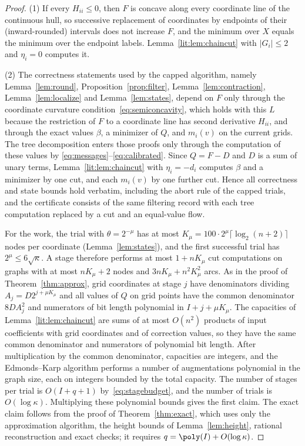 \begin{proof}
(1) If every $H_{ii}\le0$, then $F$ is concave along every coordinate line of the continuous
hull, so successive replacement of coordinates by endpoints of their (inward-rounded) intervals
does not increase $F$, and the minimum over $X$ equals the minimum over the endpoint labels.
Lemma~\ref{lit:lem:chaincut} with $|G_i|\le2$ and $\eta_i=0$ computes it.

(2) The correctness statements used by the capped algorithm, namely Lemma~\ref{lem:round},
Proposition~\ref{prop:filter}, Lemma~\ref{lem:contraction}, Lemma~\ref{lem:localize} and
Lemma~\ref{lem:states}, depend on $F$ only through the coordinate curvature
condition~\eqref{eq:semiconcavity}, which holds with this $L$ because the restriction of $F$ to a
coordinate line has second derivative $H_{ii}$, and through the exact values $\beta$, a
minimizer of $Q$, and $m_i(v)$ on the current grids. The tree decomposition enters those proofs
only through the computation of these values by \eqref{eq:messages}--\eqref{eq:calibrated}.
Since $Q=F-D$ and $D$ is a sum of unary terms, Lemma~\ref{lit:lem:chaincut} with
$\eta_i=-d_i$ computes $\beta$ and a minimizer by one cut, and each $m_i(v)$ by one further cut.
Hence all correctness and state bounds hold verbatim, including the abort rule of the capped
trials, and the certificate consists of the same filtering record with each tree computation
replaced by a cut and an equal-value flow.

For the work, the trial with $\theta=2^{-\mu}$ has at most
$K_\mu=100\cdot2^\mu\lceil\log_2(n+2)\rceil$ nodes per coordinate (Lemma~\ref{lem:states}),
and the first successful trial has $2^\mu\le6\sqrt\kappa$. A stage therefore performs at most
$1+nK_\mu$ cut computations on graphs with at most $nK_\mu+2$ nodes and
$3nK_\mu+n^2K_\mu^2$ arcs. As in the proof of Theorem~\ref{thm:approx}, grid coordinates at
stage $j$ have denominators dividing $A_j=D2^{j+\mu K_\mu}$ and all values of $Q$ on grid points
have the common denominator $8DA_j^2$ and numerators of bit length polynomial in
$I+j+\mu K_\mu$. The capacities of Lemma~\ref{lit:lem:chaincut} are sums of at most
$O(n^2)$ products of input coefficients with grid coordinates and of correction values, so they
have the same common denominator and numerators of polynomial bit length. After multiplication by
the common denominator, capacities are integers, and the Edmonds--Karp algorithm performs a
number of augmentations polynomial in the graph size, each on integers bounded by the total
capacity. The number of stages per trial is $O(I+q+1)$ by~\eqref{eq:stagebudget}, and the number
of trials is $O(\log\kappa)$. Multiplying these polynomial bounds gives the first claim. The
exact claim follows from the proof of Theorem~\ref{thm:exact}, which uses only the approximation
algorithm, the height bounds of Lemma~\ref{lem:height}, rational reconstruction and exact
checks; it requires $q=\poly(I)+O(\log\kappa)$.
\end{proof}

